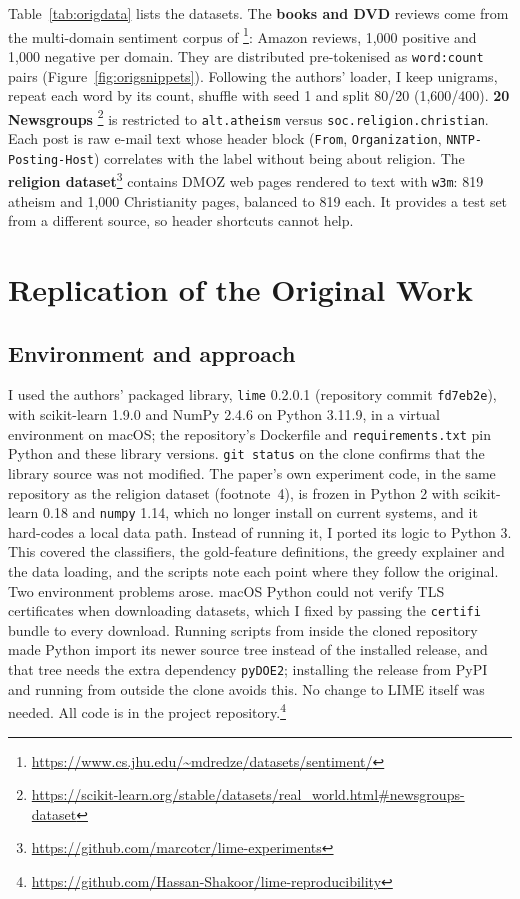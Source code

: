 \documentclass[11pt]{article}
\newcommand{\tok}[1]{\texttt{#1}}
\begin{document}
Table~\ref{tab:origdata} lists the datasets. The \textbf{books and DVD} reviews come from the multi-domain sentiment corpus of \citet{blitzer2007biographies}\footnote{\url{https://www.cs.jhu.edu/~mdredze/datasets/sentiment/}}: Amazon reviews, 1,000 positive and 1,000 negative per domain. They are distributed pre-tokenised as \tok{word:count} pairs (Figure~\ref{fig:origsnippets}). Following the authors' loader, I keep unigrams, repeat each word by its count, shuffle with seed 1 and split 80/20 (1,600/400). \textbf{20 Newsgroups} \citep{lang1995newsweeder}\footnote{\url{https://scikit-learn.org/stable/datasets/real_world.html\#newsgroups-dataset}} is restricted to \tok{alt.atheism} versus \tok{soc.religion.christian}. Each post is raw e-mail text whose header block (\tok{From}, \tok{Organization}, \tok{NNTP-Posting-Host}) correlates with the label without being about religion. The \textbf{religion dataset}\footnote{\url{https://github.com/marcotcr/lime-experiments}} contains DMOZ web pages rendered to text with \tok{w3m}: 819 atheism and 1,000 Christianity pages, balanced to 819 each. It provides a test set from a different source, so header shortcuts cannot help.

\section{Replication of the Original Work}
\label{sec:replication}

\subsection{Environment and approach}
I used the authors' packaged library, \tok{lime} 0.2.0.1 (repository commit \tok{fd7eb2e}), with scikit-learn 1.9.0 and NumPy 2.4.6 on Python 3.11.9, in a virtual environment on macOS; the repository's Dockerfile and \tok{requirements.txt} pin Python and these library versions. \texttt{git status} on the clone confirms that the library source was not modified. The paper's own experiment code, in the same repository as the religion dataset (footnote~4), is frozen in Python 2 with scikit-learn 0.18 and \tok{numpy} 1.14, which no longer install on current systems, and it hard-codes a local data path. Instead of running it, I ported its logic to Python 3. This covered the classifiers, the gold-feature definitions, the greedy explainer and the data loading, and the scripts note each point where they follow the original. Two environment problems arose. macOS Python could not verify TLS certificates when downloading datasets, which I fixed by passing the \tok{certifi} bundle to every download. Running scripts from inside the cloned repository made Python import its newer source tree instead of the installed release, and that tree needs the extra dependency \tok{pyDOE2}; installing the release from PyPI and running from outside the clone avoids this. No change to LIME itself was needed. All code is in the project repository.\footnote{\url{https://github.com/Hassan-Shakoor/lime-reproducibility}}
\end{document}
